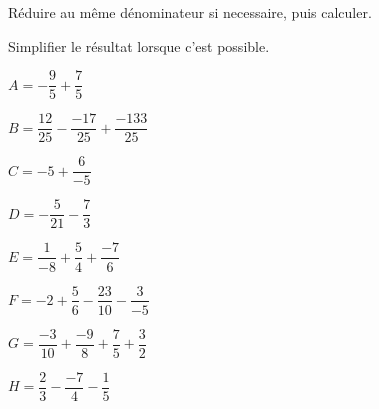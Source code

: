 \begin{exercice*}
    Réduire au même dénominateur si necessaire, puis calculer.

    Simplifier le résultat lorsque c'est possible.
    \begin{list}{}{}            
        \begin{spacing}{2}                
            \item $A=-\dfrac{9}{5}+\dfrac{7}{5}$
            \item $B=\dfrac{12}{25}-\dfrac{-17}{25}+\dfrac{-133}{25}$
            \item $C=-5+\dfrac{6}{-5}$
            \item $D=-\dfrac{5}{21}-\dfrac{7}{3}$
            \item $E=\dfrac{1}{-8}+\dfrac{5}{4}+\dfrac{-7}{6}$
            \item $F=-2+\dfrac{5}{6}-\dfrac{23}{10}-\dfrac{3}{-5}$
            \item $G=\dfrac{-3}{10}+\dfrac{-9}{8}+\dfrac{7}{5}+\dfrac{3}{2}$
            \item $H=\dfrac{2}{3}-\dfrac{-7}{4}-\dfrac{1}{5}$
        \end{spacing}
    \end{list}
\end{exercice*}

